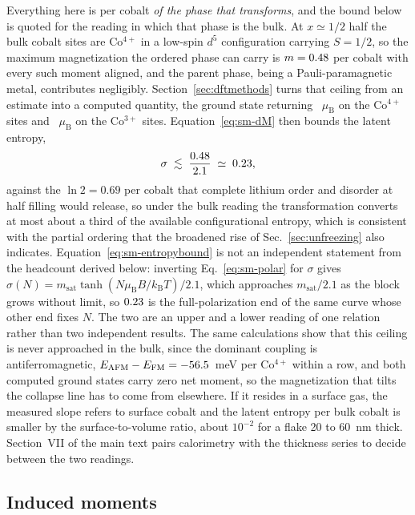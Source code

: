 \documentclass[reprint,twocolumn,prb,amsmath,amssymb,superscriptaddress,floatfix]{revtex4-2}
\newcommand{\kB}{k_{\mathrm{B}}}
\newcommand{\muBs}{\mu_{\mathrm{B}}}
\begin{document}
Everything here is per cobalt \emph{of the phase that transforms}, and the bound below is
quoted for the reading in which that phase is the bulk. At $x\simeq1/2$ half the bulk cobalt
sites are Co$^{4+}$ in a low-spin $d^{5}$ configuration carrying $S=1/2$, so the maximum
magnetization the ordered phase can carry is $m=0.48$ per cobalt with every such moment
aligned, and the parent phase, being a Pauli-paramagnetic metal, contributes negligibly.
Section~\ref{sec:dftmethods} turns that ceiling from an estimate into a computed quantity, the
ground state returning \comomentRow~$\muBs$ on the Co$^{4+}$ sites and \comomentThreeRow~$\muBs$
on the Co$^{3+}$ sites. Equation~\eqref{eq:sm-dM} then bounds the latent entropy,
\begin{equation}
  \sigma \;\lesssim\; \frac{0.48}{2.1} \;\simeq\; 0.23 ,
  \label{eq:sm-entropybound}
\end{equation}
against the $\ln2=0.69$ per cobalt that complete lithium order and disorder at half filling would
release, so under the bulk reading the transformation converts at most about a third of the
available configurational entropy, which is consistent with the partial ordering that the
broadened rise of Sec.~\ref{sec:unfreezing} also indicates. Equation~\eqref{eq:sm-entropybound}
is not an independent statement from the headcount derived below: inverting
Eq.~\eqref{eq:sm-polar} for $\sigma$ gives
$\sigma(N)=m_{\mathrm{sat}}\tanh(N\muBs B/\kB T)/2.1$, which approaches $m_{\mathrm{sat}}/2.1$
as the block grows without limit, so $0.23$ is the full-polarization end of the same curve
whose other end fixes $N$. The two are an upper and a lower reading of one relation rather than
two independent results. The same calculations
show that this
ceiling is never approached in the bulk, since the dominant coupling is antiferromagnetic,
$E_{\mathrm{AFM}}-E_{\mathrm{FM}}=-56.5$~meV per Co$^{4+}$ within a row, and both computed
ground states carry zero net moment, so the magnetization that tilts the collapse line has to
come from elsewhere. If it resides in a surface gas, the measured slope refers to surface cobalt
and the latent entropy per bulk cobalt is smaller by the surface-to-volume ratio, about
$10^{-2}$ for a flake 20 to 60~nm thick. Section~VII of the main text pairs calorimetry with the
thickness series to decide between the two readings.

\subsection{Induced moments}
\end{document}

